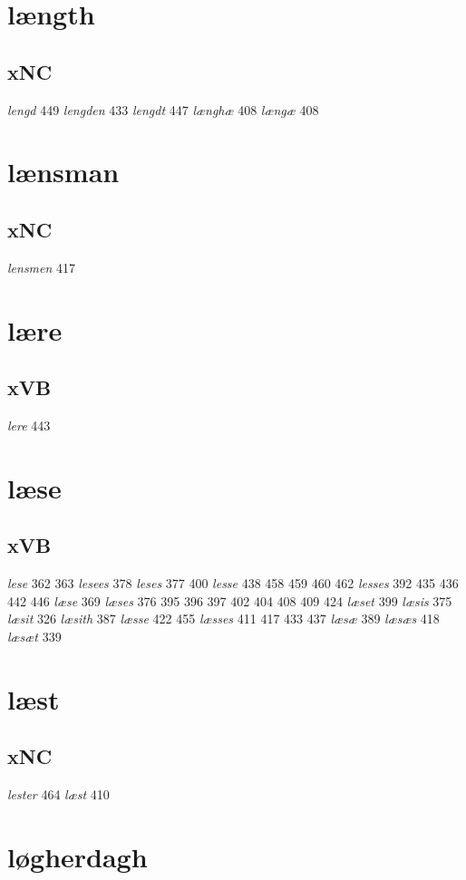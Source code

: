 \documentclass[a4paper,twocolumn]{article}
\begin{document}
\section{længth}
\label{sec:org6ffd688}
\subsection{xNC}
\label{sec:org609513b}
\emph{lengd} 449 \emph{lengden} 433 \emph{lengdt} 447 \emph{længhæ} 408 \emph{længæ} 408 
\section{lænsman}
\label{sec:orgc795703}
\subsection{xNC}
\label{sec:org26ffdf4}
\emph{lensmen} 417 
\section{lære}
\label{sec:org712edad}
\subsection{xVB}
\label{sec:org399220b}
\emph{lere} 443 
\section{læse}
\label{sec:orge5b6d9f}
\subsection{xVB}
\label{sec:org1c223c4}
\emph{lese} 362 363 \emph{lesees} 378 \emph{leses} 377 400 \emph{lesse} 438 458 459 460 462 \emph{lesses} 392 435 436 442 446 \emph{læse} 369 \emph{læses} 376 395 396 397 402 404 408 409 424 \emph{læset} 399 \emph{læsis} 375 \emph{læsit} 326 \emph{læsith} 387 \emph{læsse} 422 455 \emph{læsses} 411 417 433 437 \emph{læsæ} 389 \emph{læsæs} 418 \emph{læsæt} 339 
\section{læst}
\label{sec:orgbae5ccd}
\subsection{xNC}
\label{sec:org474c06b}
\emph{lester} 464 \emph{læst} 410 
\section{løgherdagh}
\label{sec:org0e96ae6}
\end{document}
